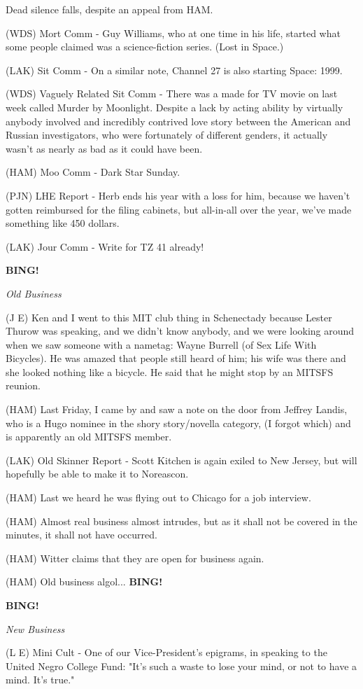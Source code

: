 \documentclass[12pt]{article}
\newcommand{\bing}{{\bf BING!} }
\newcommand{\goto}[1]{\bing \vskip 12pt \centerline{{\em{#1}}}}
\begin{document}
Dead silence falls, despite an appeal from HAM.

(WDS) Mort Comm - Guy Williams, who at one time in his life, started what some people claimed was a science-fiction series. (Lost in Space.)

(LAK) Sit Comm - On a similar note, Channel 27 is also starting Space: 1999.

(WDS) Vaguely Related Sit Comm - There was a made for TV movie on last week called Murder by Moonlight. Despite a lack by acting ability by virtually anybody involved and incredibly contrived love story between the American and Russian investigators, who were fortunately of different genders, it actually wasn't as nearly as bad as it could have been.

(HAM) Moo Comm - Dark Star Sunday.

(PJN) LHE Report - Herb ends his year with a loss for him, because we haven't gotten reimbursed for the filing cabinets, but all-in-all over the year, we've made something like 450 dollars.

(LAK) Jour Comm - Write for TZ 41 already!

\goto{Old Business}

(J E) Ken and I went to this MIT club thing in Schenectady because Lester Thurow was speaking, and we didn't know anybody, and we were looking around when we saw someone with a nametag: Wayne Burrell (of Sex Life With Bicycles). He was amazed that people still heard of him; his wife was there and she looked nothing like a bicycle. He said that he might stop by an MITSFS reunion.

(HAM) Last Friday, I came by and saw a note on the door from Jeffrey Landis, who is a Hugo nominee in the shory story/novella category, (I forgot which) and is apparently an old MITSFS member.

(LAK) Old Skinner Report - Scott Kitchen is again exiled to New Jersey, but will hopefully be able to make it to Noreascon.

(HAM) Last we heard he was flying out to Chicago for a job interview.

(HAM) Almost real business almost intrudes, but as it shall not be covered in the minutes, it shall not have occurred.

(HAM) Witter claims that they are open for business again.

(HAM) Old business algol... \bing

\goto{New Business}

(L E) Mini Cult - One of our Vice-President's epigrams, in speaking to the United Negro College Fund: "It's such a waste to lose your mind, or not to have a mind.  It's true."
\end{document}
